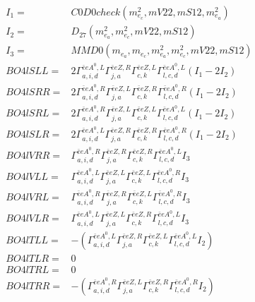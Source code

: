 \documentclass[A4,landscape]{article}
\begin{document}
\begin{align} 
I_1 = & C0D0check(m^2_{e_{{c}}}, mV22, mS12, m^2_{e_{{a}}}) \\ 
I_2 = & D_{27}(m^2_{e_{{a}}}, m^2_{e_{{c}}}, mV22, mS12) \\ 
I_3 = & MMD0(m_{e_{{a}}}, m_{e_{{c}}}, m^2_{e_{{a}}}, m^2_{e_{{c}}}, mV22, mS12) \\ 
  BO4lSLL= & 2  \Gamma^{\bar{e}e A^0 ,L}_{a, i, d} \Gamma^{\bar{e}e Z ,R}_{j, a} \Gamma^{\bar{e}e Z ,L}_{c, k} \Gamma^{\bar{e}e A^0 ,L}_{l, c, d} (I_1 - 2 I_2) \\ 
  BO4lSRR= & 2  \Gamma^{\bar{e}e A^0 ,R}_{a, i, d} \Gamma^{\bar{e}e Z ,L}_{j, a} \Gamma^{\bar{e}e Z ,R}_{c, k} \Gamma^{\bar{e}e A^0 ,R}_{l, c, d} (I_1 - 2 I_2) \\ 
  BO4lSRL= & 2  \Gamma^{\bar{e}e A^0 ,R}_{a, i, d} \Gamma^{\bar{e}e Z ,L}_{j, a} \Gamma^{\bar{e}e Z ,L}_{c, k} \Gamma^{\bar{e}e A^0 ,L}_{l, c, d} (I_1 - 2 I_2) \\ 
  BO4lSLR= & 2  \Gamma^{\bar{e}e A^0 ,L}_{a, i, d} \Gamma^{\bar{e}e Z ,R}_{j, a} \Gamma^{\bar{e}e Z ,R}_{c, k} \Gamma^{\bar{e}e A^0 ,R}_{l, c, d} (I_1 - 2 I_2) \\ 
  BO4lVRR= &  \Gamma^{\bar{e}e A^0 ,R}_{a, i, d} \Gamma^{\bar{e}e Z ,R}_{j, a} \Gamma^{\bar{e}e Z ,R}_{c, k} \Gamma^{\bar{e}e A^0 ,L}_{l, c, d} I_3 \\ 
  BO4lVLL= &  \Gamma^{\bar{e}e A^0 ,L}_{a, i, d} \Gamma^{\bar{e}e Z ,L}_{j, a} \Gamma^{\bar{e}e Z ,L}_{c, k} \Gamma^{\bar{e}e A^0 ,R}_{l, c, d} I_3 \\ 
  BO4lVRL= &  \Gamma^{\bar{e}e A^0 ,R}_{a, i, d} \Gamma^{\bar{e}e Z ,R}_{j, a} \Gamma^{\bar{e}e Z ,L}_{c, k} \Gamma^{\bar{e}e A^0 ,R}_{l, c, d} I_3 \\ 
  BO4lVLR= &  \Gamma^{\bar{e}e A^0 ,L}_{a, i, d} \Gamma^{\bar{e}e Z ,L}_{j, a} \Gamma^{\bar{e}e Z ,R}_{c, k} \Gamma^{\bar{e}e A^0 ,L}_{l, c, d} I_3 \\ 
  BO4lTLL= & -( \Gamma^{\bar{e}e A^0 ,L}_{a, i, d} \Gamma^{\bar{e}e Z ,R}_{j, a} \Gamma^{\bar{e}e Z ,L}_{c, k} \Gamma^{\bar{e}e A^0 ,L}_{l, c, d} I_2) \\ 
  BO4lTLR= & 0 \\ 
  BO4lTRL= & 0 \\ 
  BO4lTRR= & -( \Gamma^{\bar{e}e A^0 ,R}_{a, i, d} \Gamma^{\bar{e}e Z ,L}_{j, a} \Gamma^{\bar{e}e Z ,R}_{c, k} \Gamma^{\bar{e}e A^0 ,R}_{l, c, d} I_2) \\ 
\end{align} 
\end{document}

